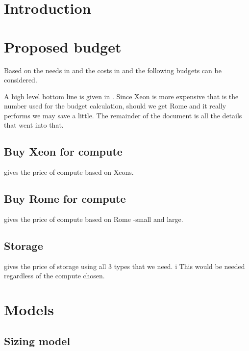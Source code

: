 \section{Introduction}



\section{Proposed budget}\label{sec:cost}
Based on the needs in  and the costs in  and 
the following budgets can be considered.

A high level bottom line is given in .
Since Xeon is more expensive that is the number used for the budget calculation, should we get Rome and it really performs we may save a little.
The remainder of the document is all the details that went into that.



\subsection{Buy Xeon for compute} \label{sec:xeon}
 gives the price of compute based on Xeons.


\subsection{Buy Rome for compute} \label{sec:rome}
 gives the price of compute based on Rome -small and large.


\subsection{Storage} \label{sec:storagecost}
 gives the price of storage using all 3 types that we need. i
This would be needed regardless of the compute chosen.


\section{ Models}\label{sec:model}
\subsection{Sizing model}\label{sec:sizemodel}

